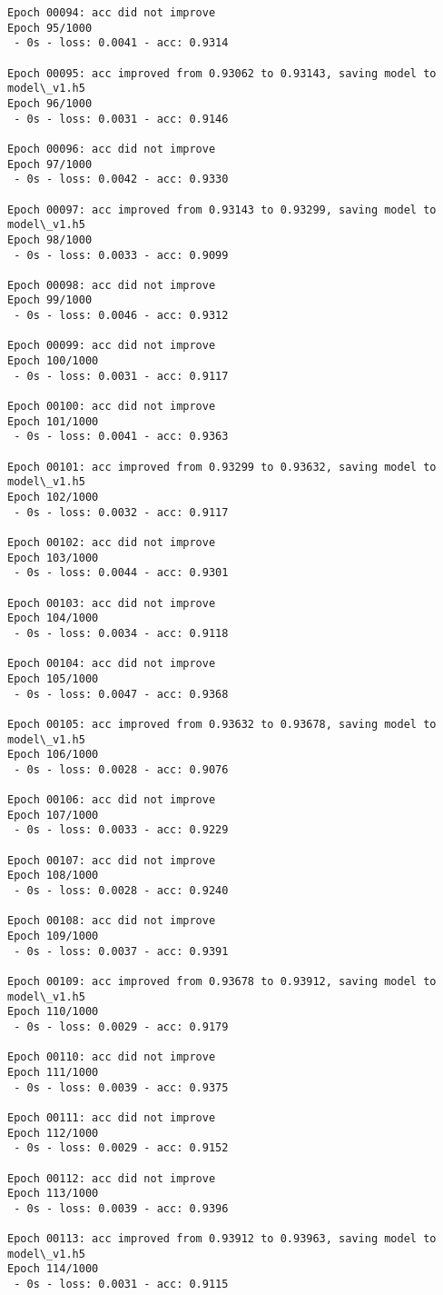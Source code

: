 \documentclass[11pt]{article}
\begin{document}
\begin{Verbatim}[commandchars=\\\{\}]
Epoch 00094: acc did not improve
Epoch 95/1000
 - 0s - loss: 0.0041 - acc: 0.9314

Epoch 00095: acc improved from 0.93062 to 0.93143, saving model to model\_v1.h5
Epoch 96/1000
 - 0s - loss: 0.0031 - acc: 0.9146

Epoch 00096: acc did not improve
Epoch 97/1000
 - 0s - loss: 0.0042 - acc: 0.9330

Epoch 00097: acc improved from 0.93143 to 0.93299, saving model to model\_v1.h5
Epoch 98/1000
 - 0s - loss: 0.0033 - acc: 0.9099

Epoch 00098: acc did not improve
Epoch 99/1000
 - 0s - loss: 0.0046 - acc: 0.9312

Epoch 00099: acc did not improve
Epoch 100/1000
 - 0s - loss: 0.0031 - acc: 0.9117

Epoch 00100: acc did not improve
Epoch 101/1000
 - 0s - loss: 0.0041 - acc: 0.9363

Epoch 00101: acc improved from 0.93299 to 0.93632, saving model to model\_v1.h5
Epoch 102/1000
 - 0s - loss: 0.0032 - acc: 0.9117

Epoch 00102: acc did not improve
Epoch 103/1000
 - 0s - loss: 0.0044 - acc: 0.9301

Epoch 00103: acc did not improve
Epoch 104/1000
 - 0s - loss: 0.0034 - acc: 0.9118

Epoch 00104: acc did not improve
Epoch 105/1000
 - 0s - loss: 0.0047 - acc: 0.9368

Epoch 00105: acc improved from 0.93632 to 0.93678, saving model to model\_v1.h5
Epoch 106/1000
 - 0s - loss: 0.0028 - acc: 0.9076

Epoch 00106: acc did not improve
Epoch 107/1000
 - 0s - loss: 0.0033 - acc: 0.9229

Epoch 00107: acc did not improve
Epoch 108/1000
 - 0s - loss: 0.0028 - acc: 0.9240

Epoch 00108: acc did not improve
Epoch 109/1000
 - 0s - loss: 0.0037 - acc: 0.9391

Epoch 00109: acc improved from 0.93678 to 0.93912, saving model to model\_v1.h5
Epoch 110/1000
 - 0s - loss: 0.0029 - acc: 0.9179

Epoch 00110: acc did not improve
Epoch 111/1000
 - 0s - loss: 0.0039 - acc: 0.9375

Epoch 00111: acc did not improve
Epoch 112/1000
 - 0s - loss: 0.0029 - acc: 0.9152

Epoch 00112: acc did not improve
Epoch 113/1000
 - 0s - loss: 0.0039 - acc: 0.9396

Epoch 00113: acc improved from 0.93912 to 0.93963, saving model to model\_v1.h5
Epoch 114/1000
 - 0s - loss: 0.0031 - acc: 0.9115


\end{Verbatim}
\end{document}
